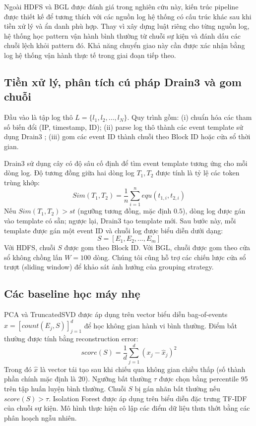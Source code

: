 \documentclass[conference]{IEEEtran}
\begin{document}
Ngoài HDFS và BGL được đánh giá trong nghiên cứu này, kiến trúc pipeline được thiết kế để tương thích với các nguồn log hệ thống có cấu trúc khác sau khi tiền xử lý và ẩn danh phù hợp. Thay vì xây dựng luật riêng cho từng nguồn log, hệ thống học pattern vận hành bình thường từ chuỗi sự kiện và đánh dấu các chuỗi lệch khỏi pattern đó. Khả năng chuyển giao này cần được xác nhận bằng log hệ thống vận hành thực tế trong giai đoạn tiếp theo.

\subsection{Tiền xử lý, phân tích cú pháp Drain3 và gom chuỗi}
Đầu vào là tập log thô $L=\{l_1,l_2,\ldots,l_N\}$. Quy trình gồm: (i) chuẩn hóa các tham số biến đổi (IP, timestamp, ID); (ii) parse log thô thành các event template sử dụng Drain3 \cite{b3}; (iii) gom các event ID thành chuỗi theo Block ID hoặc cửa sổ thời gian.

Drain3 sử dụng cây có độ sâu cố định để tìm event template tương ứng cho mỗi dòng log. Độ tương đồng giữa hai dòng log $T_1, T_2$ được tính là tỷ lệ các token trùng khớp:
\begin{equation}
Sim(T_1, T_2) = \frac{1}{n} \sum_{i=1}^{n} equ(t_{1,i}, t_{2,i})
\label{eq_sim}
\end{equation}
Nếu $Sim(T_1, T_2) > st$ (ngưỡng tương đồng, mặc định $0.5$), dòng log được gán vào template có sẵn; ngược lại, Drain3 tạo template mới. Sau bước này, mỗi template được gán một event ID và chuỗi log được biểu diễn dưới dạng:
\begin{equation}
S = [E_1, E_2, ..., E_m]
\end{equation}
Với HDFS, chuỗi $S$ được gom theo Block ID. Với BGL, chuỗi được gom theo cửa sổ không chồng lấn $W{=}100$ dòng. Chúng tôi cũng hỗ trợ các chiến lược cửa sổ trượt (sliding window) để khảo sát ảnh hưởng của grouping strategy.

\subsection{Các baseline học máy nhẹ}
PCA và TruncatedSVD được áp dụng trên vector biểu diễn bag-of-events $x = [count(E_j, S)]_{j=1}^d$ để học không gian hành vi bình thường. Điểm bất thường được tính bằng reconstruction error:
\begin{equation}
score(S)=\frac{1}{d}\sum_{j=1}^{d}(x_j-\hat{x}_j)^2
\label{eq_reconstruction}
\end{equation}
Trong đó $\hat{x}$ là vector tái tạo sau khi chiếu qua không gian chiều thấp (số thành phần chính mặc định là 20). Ngưỡng bất thường $\tau$ được chọn bằng percentile 95 trên tập huấn luyện bình thường. Chuỗi $S$ bị gán nhãn bất thường nếu $score(S) > \tau$.
Isolation Forest được áp dụng trên biểu diễn đặc trưng TF-IDF của chuỗi sự kiện. Mô hình thực hiện cô lập các điểm dữ liệu thưa thớt bằng các phân hoạch ngẫu nhiên.
\end{document}
